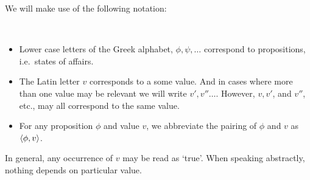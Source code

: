 \begin{note}
  We will make use of the following notation:
  \begin{notation}
    \mbox{ }
    \vspace{-\baselineskip}
    \begin{itemize}
    \item
      Lower case letters of the Greek alphabet, \(\phi, \psi, \dots\) correspond to propositions, i.e.\ states of affairs.
    \item
      The Latin letter \(v\) corresponds to a some value.
      And in cases where more than one value may be relevant we will write \(v', v'' \dots\).
      However, \(v, v'\), and \(v''\), etc., may all correspond to the same value.
    \item
      For any proposition \(\phi\) and value \(v\), we abbreviate the pairing of \(\phi\) and \(v\) as \(\langle \phi, v \rangle\).
    \end{itemize}
    \vspace{-\baselineskip}
  \end{notation}

  In general, any occurrence of \(v\) may be read as `true'.
  When speaking abstractly, nothing depends on particular value.



\end{note}

